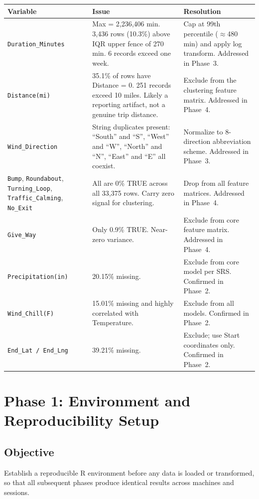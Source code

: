 \documentclass[11pt]{article}
\begin{document}
\begin{longtable}{|p{4.5cm}|p{4.5cm}|p{5cm}|}
\hline
\textbf{Variable} & \textbf{Issue} & \textbf{Resolution} \\
\hline
\texttt{Duration\_Minutes} & Max = 2,236,406 min. 3,436 rows (10.3\%) above IQR upper fence of 270 min. 6 records exceed one week. & Cap at 99th percentile ($\approx$480 min) and apply log transform. Addressed in Phase~3. \\
\hline
\texttt{Distance(mi)} & 35.1\% of rows have Distance = 0. 251 records exceed 10 miles. Likely a reporting artifact, not a genuine trip distance. & Exclude from the clustering feature matrix. Addressed in Phase~4. \\
\hline
\texttt{Wind\_Direction} & String duplicates present: ``South'' and ``S'', ``West'' and ``W'', ``North'' and ``N'', ``East'' and ``E'' all coexist. & Normalize to 8-direction abbreviation scheme. Addressed in Phase~3. \\
\hline
\texttt{Bump}, \texttt{Roundabout}, \texttt{Turning\_Loop}, \texttt{Traffic\_Calming}, \texttt{No\_Exit} & All are 0\% TRUE across all 33,375 rows. Carry zero signal for clustering. & Drop from all feature matrices. Addressed in Phase~4. \\
\hline
\texttt{Give\_Way} & Only 0.9\% TRUE. Near-zero variance. & Exclude from core feature matrix. Addressed in Phase~4. \\
\hline
\texttt{Precipitation(in)} & 20.15\% missing. & Exclude from core model per SRS. Confirmed in Phase~2. \\
\hline
\texttt{Wind\_Chill(F)} & 15.01\% missing and highly correlated with Temperature. & Exclude from all models. Confirmed in Phase~2. \\
\hline
\texttt{End\_Lat / End\_Lng} & 39.21\% missing. & Exclude; use Start coordinates only. Confirmed in Phase~2. \\
\hline
\end{longtable}

\newpage
\section{Phase 1: Environment and Reproducibility Setup}

\subsection{Objective}

Establish a reproducible R environment before any data is loaded or transformed, so that all subsequent phases produce identical results across machines and sessions.
\end{document}
